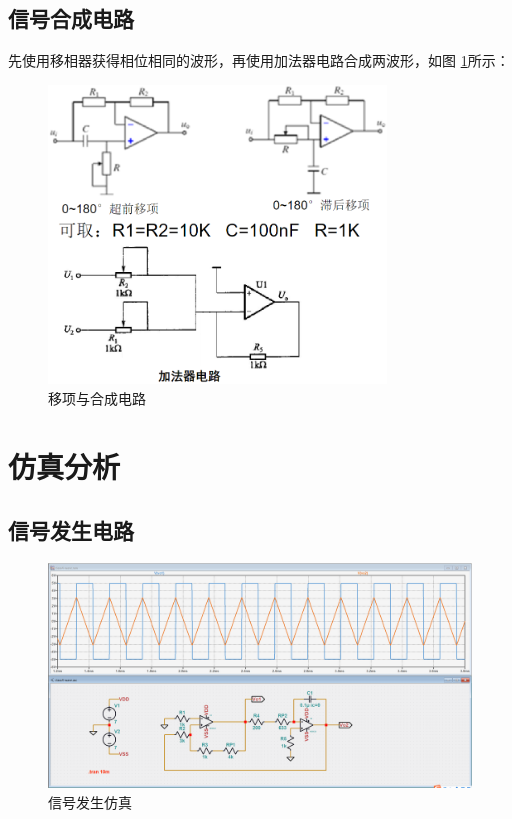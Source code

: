 \documentclass[a4paper]{article}
\theoremstyle{definition}
\theoremstyle{plain}
\theoremstyle{remark}
\newcommand{\reffig}[1]{图 \ref{#1}}
\begin{document}
\subsection{信号合成电路}
先使用移相器获得相位相同的波形，再使用加法器电路合成两波形，如\reffig{移项与合成电路}所示：
\begin{figure}[H]
	\centering
	\includegraphics[width=0.8\textwidth]{移项与合成电路.png}
	\caption{移项与合成电路}
	\label{移项与合成电路}
\end{figure}

\section{仿真分析}
\subsection{信号发生电路}
\begin{figure}[H]
	\centering
	\includegraphics[width=1\textwidth]{信号发生仿真}
	\caption{信号发生仿真}
	\label{信号发生仿真}
\end{figure}
\end{document}
